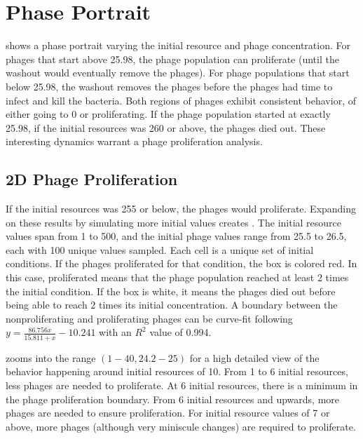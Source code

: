 \section{Phase Portrait}
\label{sec:results:phase_portrait}
 shows a phase portrait varying the initial resource and phage concentration. 
For phages that start above 25.98, the phage population can proliferate (until the washout would eventually remove the phages). 
For phage populations that start below 25.98, the washout removes the phages before the phages had time to infect and kill the bacteria. 
Both regions of phages exhibit consistent behavior, of either going to 0 or proliferating. 
If the phage population started at exactly 25.98, if the initial resources was 260 or above, the phages died out. 
These interesting dynamics warrant a phage proliferation analysis. 

\subsection{2D Phage Proliferation}
If the initial resources was 255 or below, the phages would proliferate. 
Expanding on these results by simulating more initial values creates . 
The initial resource values span from 1 to 500, and the initial phage values range from 25.5 to 26.5, each with 100 unique values sampled.
Each cell is a unique set of initial conditions. 
If the phages proliferated for that condition, the box is colored red. 
In this case, proliferated means that the phage population reached at least 2 times the initial condition. 
If the box is white, it means the phages died out before being able to reach 2 times its initial concentration. 
A boundary between the nonproliferating and proliferating phages can be curve-fit following $y=\frac{86.756x}{15.811+x} - 10.241$ with an $R^2$ value of 0.994. 

 zooms into the range $(1-40, 24.2-25)$ for a high detailed view of the behavior happening around initial resources of 10. 
From 1 to 6 initial resources, less phages are needed to proliferate. 
At 6 initial resources, there is a minimum in the phage proliferation boundary. 
From 6 initial resources and upwards, more phages are needed to ensure proliferation. 
For initial resource values of 7 or above, more phages (although very miniscule changes) are required to proliferate. 

